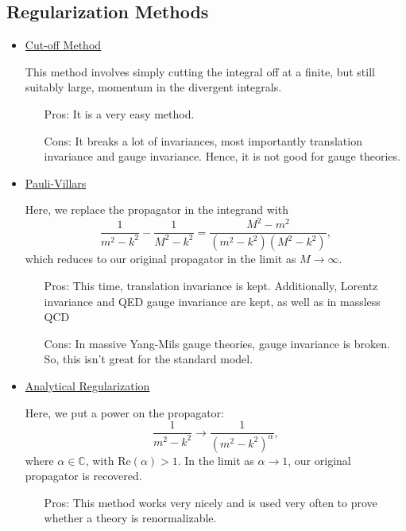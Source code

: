 \subsection*{Regularization Methods}
\begin{itemize}
    \item \ul{Cut-off Method}
    \item[] This method involves simply cutting the integral off at a finite, but still suitably large, momentum in the divergent integrals.
    \begin{enumerate}[leftmargin=0.5in]
        \item[Pros:] It is a very easy method.
        \item[Cons:] It breaks a lot of invariances, most importantly translation invariance and gauge invariance. Hence, it is not good for gauge theories.
    \end{enumerate}
    \item \ul{Pauli-Villars}
    \item[] Here, we replace the propagator in the integrand with
        \begin{equation}
            \frac{1}{m^2 - k^2} - \frac{1}{M^2 - k^2} = \frac{M^2 - m^2}{(m^2-k^2)(M^2-k^2)},
        \end{equation}
        which reduces to our original propagator in the limit as $M\rightarrow\infty$.
        \begin{enumerate}[leftmargin=0.5in]
            \item[Pros:] This time, translation invariance is kept. Additionally, Lorentz invariance and QED gauge invariance are kept, as well as in massless QCD
            \item[Cons:] In massive Yang-Mils gauge theories, gauge invariance is broken. So, this isn't great for the standard model.
        \end{enumerate}
    \item \ul{Analytical Regularization}
    \item[] Here, we put a power on the propagator:
        \begin{equation}
            \frac{1}{m^2 - k^2} \rightarrow \frac{1}{(m^2 - k^2)^{\alpha}},
        \end{equation}
        where $\alpha \in \mathbb{C}$, with $\text{Re}(\alpha) > 1$. In the limit as $\alpha \rightarrow 1$, our original propagator is recovered.
        \begin{enumerate}[leftmargin=0.5in]
            \item[Pros:] This method works very nicely and is used very often to prove whether a theory is renormalizable.

\end{enumerate}
\end{itemize}
